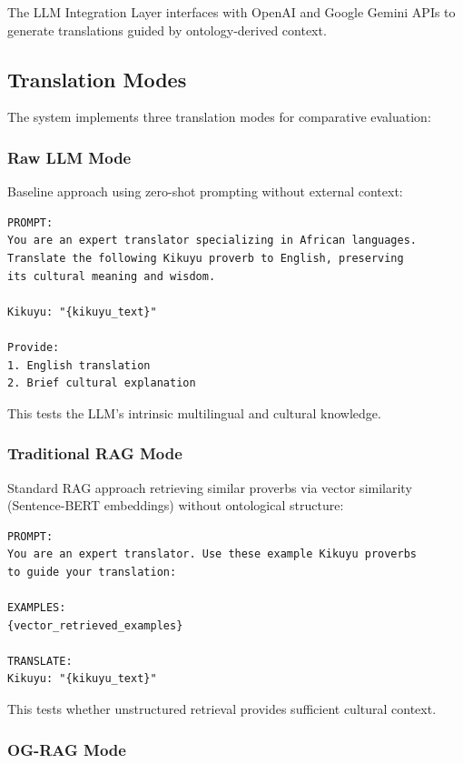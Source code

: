 The LLM Integration Layer interfaces with OpenAI and Google Gemini APIs to generate translations guided by ontology-derived context.

\subsection{Translation Modes}
\label{subsec:translation_modes}

The system implements three translation modes for comparative evaluation:

\subsubsection{Raw LLM Mode}
\label{subsubsec:raw_llm}

Baseline approach using zero-shot prompting without external context:

\begin{verbatim}
PROMPT:
You are an expert translator specializing in African languages.
Translate the following Kikuyu proverb to English, preserving
its cultural meaning and wisdom.

Kikuyu: "{kikuyu_text}"

Provide:
1. English translation
2. Brief cultural explanation
\end{verbatim}

This tests the LLM's intrinsic multilingual and cultural knowledge.

\subsubsection{Traditional RAG Mode}
\label{subsubsec:traditional_rag}

Standard RAG approach retrieving similar proverbs via vector similarity (Sentence-BERT embeddings) without ontological structure:

\begin{verbatim}
PROMPT:
You are an expert translator. Use these example Kikuyu proverbs
to guide your translation:

EXAMPLES:
{vector_retrieved_examples}

TRANSLATE:
Kikuyu: "{kikuyu_text}"
\end{verbatim}

This tests whether unstructured retrieval provides sufficient cultural context.

\subsubsection{OG-RAG Mode}
\label{subsubsec:ograg_mode}

